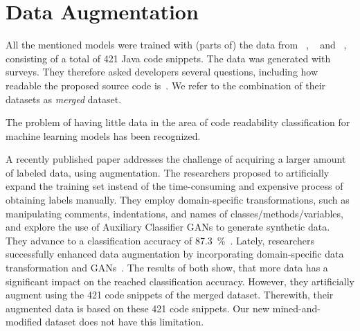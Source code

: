 \documentclass[%
class=scrreprt,
chapterprefix=false,%
open=right,%
twoside=true,%
paper=a4,%
logofile={Logo\_zentral\_farbig\_EN.png},%
thesistype=master,%
UKenglish,%
]{se2thesis}
\theoremstyle{definition}
\newcommand{\numMerged}{421\xspace}
\begin{document}
\section{Data Augmentation} \label{Data Augmentation}

	All the mentioned models were trained with (parts of) the data from \citeauthor{buse2009learning}~\cite{buse2009learning}, \citeauthor{dorn2012general}~\cite{dorn2012general} and \citeauthor{scalabrino2018comprehensive}~\cite{scalabrino2018comprehensive}, consisting of a total of \numMerged Java code snippets. The data was generated with surveys. They therefore asked developers several questions, including how readable the proposed source code is~\cite{buse2009learning, dorn2012general, scalabrino2018comprehensive}. We refer to the combination of their datasets as \textit{merged} dataset.
	
	The problem of having little data in the area of code readability classification for machine learning models has been recognized.
					
	A recently published paper addresses the challenge of acquiring a larger amount of labeled data, using augmentation. The researchers proposed to artificially expand the training set instead of the time-consuming and expensive process of obtaining labels manually. They employ domain-specific transformations, such as manipulating comments, indentations, and names of classes/methods/variables, and explore the use of Auxiliary Classifier GANs to generate synthetic data. They advance to a classification accuracy of 87.3~\%~\cite{mi2021effectiveness}.
	Lately, researchers successfully enhanced data augmentation by incorporating domain-specific data transformation and GANs~\cite{mi2022enhanced}.
	The results of both show, that more data has a significant impact on the reached classification accuracy. However, they artificially augment using the \numMerged code snippets of the merged dataset. Therewith, their augmented data is based on these \numMerged code snippets. Our new mined-and-modified dataset does not have this limitation.
	
\end{document}
